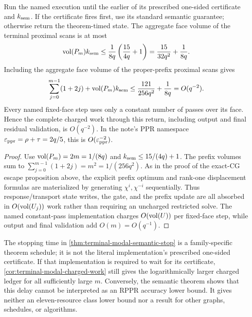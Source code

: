 \begin{corollary}
\label{cor:terminal-modal-semantic-work}
Run the named execution until the earlier of its prescribed one-sided
certificate and $k_{\rm sem}$.  If the certificate fires first, use its
standard semantic guarantee; otherwise return the theorem-timed state.  The
aggregate face volume of the terminal proximal scans is at most
\begin{equation}
 \operatorname{vol}(P_m)k_{\rm sem}
 \le\frac1{8q}\left(\frac{15}{4q}+1\right)
 =\frac{15}{32q^2}+\frac1{8q}.
 \label{eq:terminal-modal-semantic-terminal-work}
\end{equation}
Including the aggregate face volume of the proper-prefix proximal scans gives
\begin{equation}
 \sum_{j=0}^{m-1}(1+2j)+\operatorname{vol}(P_m)k_{\rm sem}
 \le\frac{121}{256q^2}+\frac1{8q}=O(q^{-2}).
 \label{eq:terminal-modal-semantic-total-work}
\end{equation}
Every named fixed-face step uses only a constant number of passes over its
face.  Hence the complete charged work through this return, including output
and final residual validation, is $O(q^{-2})$.  In the note's PPR namespace
$\varepsilon_{\mathrm{ppr}}=\rho+\tau=2q/5$, this is $O(\varepsilon_{\mathrm{ppr}}^{-2})$.
\end{corollary}

\begin{proof}
Use $\operatorname{vol}(P_m)=2m=1/(8q)$ and
$k_{\rm sem}\le15/(4q)+1$.  The prefix volumes sum to
$\sum_{j=0}^{m-1}(1+2j)=m^2=1/(256q^2)$.
As in the proof of the exact-CG escape proposition above, the explicit prefix
optimum and rank-one displacement formulas are materialized by generating
$\chi^i,\chi^{-i}$ sequentially.  Thus response/transport state writes, the
gate, and the prefix update are all absorbed in $O(\operatorname{vol}(U_j))$ work rather
than requiring an uncharged restricted solve.
The named constant-pass implementation charges $O(\operatorname{vol}(U))$ per fixed-face
step, while output and final validation add $O(m)=O(q^{-1})$.
\end{proof}

\begin{remark}
The stopping time in \cref{thm:terminal-modal-semantic-stop} is a
family-specific theorem schedule; it is not the literal implementation's
prescribed one-sided certificate.  If that implementation is required to
wait for its certificate, \cref{cor:terminal-modal-charged-work} still gives
the logarithmically larger charged ledger for all sufficiently large $m$.
Conversely, the semantic theorem shows that this delay cannot be interpreted
as an RPPR accuracy lower bound.  It gives neither an eleven-resource class
lower bound nor a result for other graphs, schedules, or algorithms.
\end{remark}

